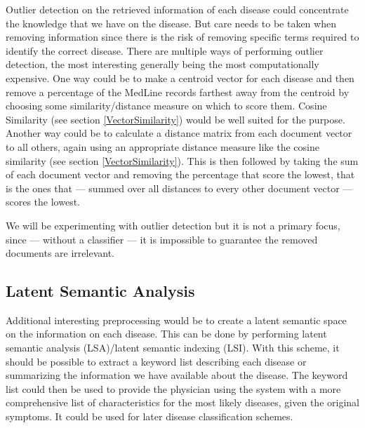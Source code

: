 Outlier detection on the retrieved information of each disease could
concentrate the knowledge that we have on the disease. But care needs
to be taken when removing information since there is the risk of
removing specific terms required to identify the correct
disease. There are multiple ways of performing outlier detection, the
most interesting generally being the most computationally
expensive. One way could be to make a centroid vector for each disease
and then remove a percentage of the MedLine records farthest away from
the centroid by choosing some similarity/distance measure on which to
score them. Cosine Similarity (see section \ref{VectorSimilarity})
would be well suited for the purpose. Another way could be to
calculate a distance matrix from each document vector to all others,
again using an appropriate distance measure like the cosine similarity
(see section \ref{VectorSimilarity}). This is then followed by taking
the sum of each document vector and removing the percentage that score
the lowest, that is the ones that --- summed over all distances to
every other document vector --- scores the lowest. 

  We will be
experimenting with outlier detection but it is not a primary focus,
since --- without a classifier --- it is impossible to guarantee the
removed documents are irrelevant.

\subsection{Latent Semantic Analysis\label{LSA}}

Additional interesting preprocessing would be to create a latent
semantic space on the information on each disease. This can be done by
performing latent semantic analysis (LSA)/latent semantic indexing
(LSI). With this scheme, it should be possible to extract a keyword
list describing each disease or summarizing the information we have
available about the disease. The keyword list could then be used to
provide the physician using the system with a more comprehensive list
of characteristics for the most likely diseases, given the original
symptoms. It could be used for later disease classification schemes.

